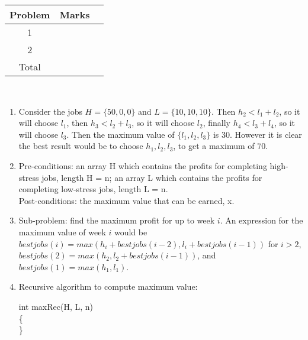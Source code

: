 \documentclass{assignment}
\begin{document}
\begin{center}
\renewcommand{\arraystretch}{2}
\begin{tabular}{|c|c|c|} \hline
Problem & Marks \\ \hline \hline
1 & \\ \hline
2 & \\ \hline
Total & \\ \hline
\end{tabular}
\end{center}

\bigskip

\begin{problemlist}

\clearpage
\pbitem
\begin{problem}
\end{problem}
\begin{answer}
\\
\begin{enumerate}
\item
Consider the jobs $H=\{50,0,0\}$ and $L=\{10,10,10\}$. Then $h_2 < l_1 + l_2$, so it will choose $l_1$, then $h_3 < l_2 + l_3$, so it will choose $l_2$, finally $h_4 < l_3 + l_4$, so it will choose $l_3$. Then the maximum value of $\{l_1,l_2,l_3\}$ is $30$. However it is clear the best result would be to choose $h_1,l_2,l_3$, to get a maximum of $70$.
\item
Pre-conditions: an array H which contains the profits for completing high-stress jobs, length H =  n; an array L which contains the profits for completing low-stress jobs, length L = n.\\
Post-conditions: the maximum value that can be earned, x.
\item
Sub-problem: find the maximum profit for up to week $i$. An expression for the maximum value of week $i$ would be $bestjobs(i) = max(h_i + bestjobs(i-2), l_i + bestjobs(i-1))$ for $i>2$, $bestjobs(2) = max(h_2, l_2 + bestjobs(i-1))$, and $bestjobs(1) = max(h_1, l_1)$.
\item
Recursive algorithm to compute maximum value:\\
\IncMargin{3em}
\begin{algorithm}
  int maxRec(H, L, n)\\\{\\
  \Indp
  \Indm
  \}
\end{algorithm}
\DecMargin{3em}

\end{enumerate}
\end{answer}
\end{problemlist}
\end{document}
